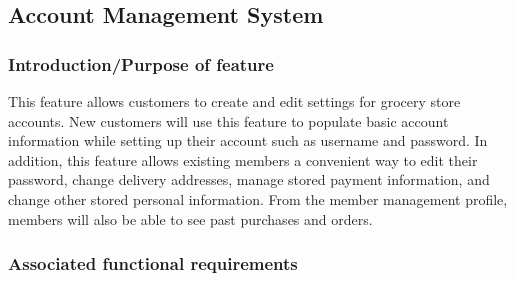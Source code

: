\documentclass{scrreprt}
\theoremstyle{funreq}
\begin{document}
	\subsection{Account Management System}
\subsubsection{Introduction/Purpose of feature}
This feature allows customers to create and edit settings for grocery store accounts.  New customers will use this feature to populate basic account information while setting up their account such as username and password.  In addition, this feature allows existing members a convenient way to edit their password, change delivery addresses, manage stored payment information, and change other stored personal information.  From the member management profile, members will also be able to see past purchases and orders.

%
\subsubsection{Associated functional requirements}
\end{document}

